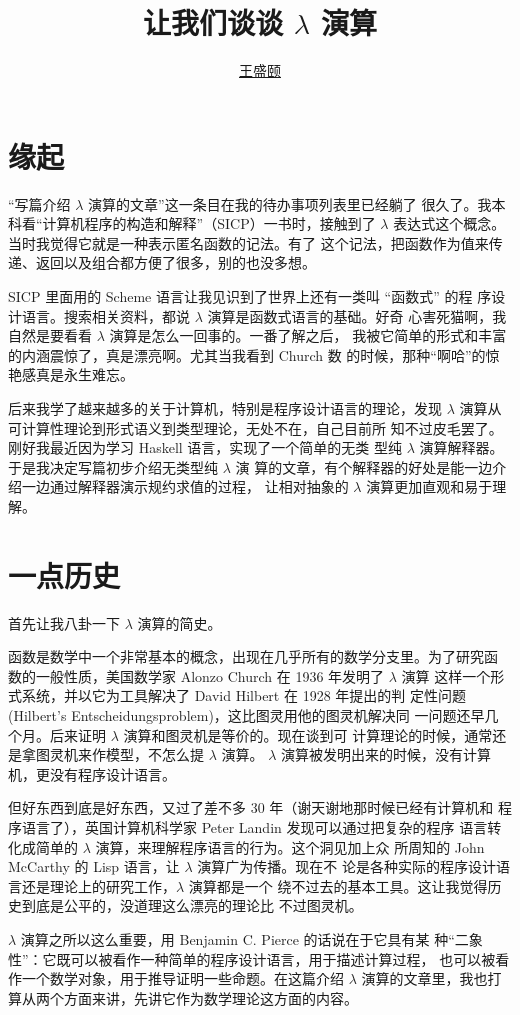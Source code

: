 \documentclass[a4paper,adobefonts]{ctexart}
\begin{document}
\title{{\bfseries 让我们谈谈 $\lambda$ 演算}}
\author{\href{mailto:txyyss@gmail.com}{王盛颐}}
\date{}
\maketitle

\section*{缘起}

``写篇介绍 $\lambda$ 演算的文章''这一条目在我的待办事项列表里已经躺了
很久了。我本科看``计算机程序的构造和解释''（SICP）一书时，接触到了
$\lambda$ 表达式这个概念。当时我觉得它就是一种表示匿名函数的记法。有了
这个记法，把函数作为值来传递、返回以及组合都方便了很多，别的也没多想。

SICP 里面用的 Scheme 语言让我见识到了世界上还有一类叫 ``函数式'' 的程
序设计语言。搜索相关资料，都说 $\lambda$ 演算是函数式语言的基础。好奇
心害死猫啊，我自然是要看看 $\lambda$ 演算是怎么一回事的。一番了解之后，
我被它简单的形式和丰富的内涵震惊了，真是漂亮啊。尤其当我看到 Church 数
的时候，那种``啊哈''的惊艳感真是永生难忘。

后来我学了越来越多的关于计算机，特别是程序设计语言的理论，发现
$\lambda$ 演算从可计算性理论到形式语义到类型理论，无处不在，自己目前所
知不过皮毛罢了。刚好我最近因为学习 Haskell 语言，实现了一个简单的无类
型纯 $\lambda$ 演算解释器。于是我决定写篇初步介绍无类型纯 $\lambda$ 演
算的文章，有个解释器的好处是能一边介绍一边通过解释器演示规约求值的过程，
让相对抽象的 $\lambda$ 演算更加直观和易于理解。

\section{一点历史}

首先让我八卦一下 $\lambda$ 演算的简史。

函数是数学中一个非常基本的概念，出现在几乎所有的数学分支里。为了研究函
数的一般性质，美国数学家 Alonzo Church 在 1936 年发明了 $\lambda$ 演算
这样一个形式系统，并以它为工具解决了 David Hilbert 在 1928 年提出的判
定性问题 (Hilbert's Entscheidungsproblem)，这比图灵用他的图灵机解决同
一问题还早几个月。后来证明 $\lambda$ 演算和图灵机是等价的。现在谈到可
计算理论的时候，通常还是拿图灵机来作模型，不怎么提 $\lambda$ 演算。
$\lambda$ 演算被发明出来的时候，没有计算机，更没有程序设计语言。

但好东西到底是好东西，又过了差不多 30 年（谢天谢地那时候已经有计算机和
  程序语言了），英国计算机科学家 Peter Landin 发现可以通过把复杂的程序
语言转化成简单的 $\lambda$ 演算，来理解程序语言的行为。这个洞见加上众
所周知的 John McCarthy 的 Lisp 语言，让 $\lambda$ 演算广为传播。现在不
论是各种实际的程序设计语言还是理论上的研究工作，$\lambda$ 演算都是一个
绕不过去的基本工具。这让我觉得历史到底是公平的，没道理这么漂亮的理论比
不过图灵机。

$\lambda$ 演算之所以这么重要，用 Benjamin C. Pierce 的话说在于它具有某
种``二象性''：它既可以被看作一种简单的程序设计语言，用于描述计算过程，
也可以被看作一个数学对象，用于推导证明一些命题。在这篇介绍 $\lambda$
演算的文章里，我也打算从两个方面来讲，先讲它作为数学理论这方面的内容。

\end{document}
